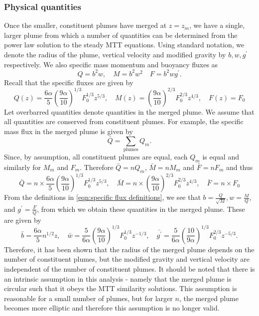 \documentclass{jfm}
\begin{document}
	\subsubsection{Physical quantities}\label{subsubsec:Physical quantities}
	Once the smaller, constituent plumes have merged at $z = z_m$, we have a single, larger plume from which a number of quantities can be determined from the power law solution to the steady MTT equations. Using standard notation, we denote the radius of the plume, vertical velocity and modified gravity by $b, w, g^{\prime}$ respectively. We also specific mass momentum and buoyancy fluxes as
	\begin{equation}
		Q = b^2w, \quad M = b^2 w^2 \quad F = b^2 w g^{\prime}. \label{eqn:specific flux definitions}
	\end{equation}
	Recall that the specific fluxes are given by
	\begin{equation}
		Q(z) = \frac{6\alpha}{5}\left(\frac{9\alpha}{10}\right)^{1/3}F_0^{1/3}z^{5/3}, \quad
		M(z) = \left(\frac{9\alpha}{10}\right)^{2/3}F_0^{2/3}z^{4/3}, \quad F(z) = F_0 \label{eqn:specific flux solutions}
	\end{equation}
	Let overbarred quantities denote quantities in the merged plume. We assume that all quantities are conserved from constituent plumes. For example, the specific mass flux in the merged plume is given by
	\begin{equation}
		\bar{Q} = \sum_{\text{plumes}}Q_m.
	\end{equation}
	Since, by assumption, all constituent plumes are equal, each $Q_m$ is equal and similarly for $M_m$ and $F_m$. Therefore $\bar{Q} = nQ_m$, $\bar{M} = nM_m$ and $\bar{F} = nF_m$ and thus
	\begin{equation}
	\bar{Q} = n \times  \frac{6\alpha}{5}\left(\frac{9\alpha}{10}\right)^{1/3}F_0^{1/3}z^{5/3}, \quad
	\bar{M} = n \times \left(\frac{9\alpha}{10}\right)^{2/3}F_0^{2/3}z^{4/3}, \quad \bar{F} = n\times F_0 \label{eqn:merged quantities}
	\end{equation}
	From the definitions in \eqref{eqn:specific flux definitions}, we see that $b = \tfrac{Q}{\sqrt{M}}, w = \tfrac{M}{Q}$, and $g^{\prime} = \tfrac{F}{Q}$, from which we obtain these quantities in the merged plume. These are given by
	\begin{equation}
		\bar{b} = \frac{6\alpha}{5}n^{1/2}z, \quad \bar{w} = \frac{5}{6\alpha}\left(\frac{9\alpha}{10}\right)^{1/3}F_0^{1/3}z^{-1/3}, \quad \bar{g^{\prime}} = \frac{5}{6\alpha}\left(\frac{10}{9\alpha}\right)^{1/3}F_0^{2/3}z^{-5/3}.
	\end{equation}
	Therefore, it has been shown that the radius of the merged plume depends on the number of constituent plumes, but the modified gravity and vertical velocity are independent of the number of constituent plumes. It should be noted that there is an intrinsic assumption in this analysis - namely that the merged plume is circular such that it obeys the MTT similarity solutions. This assumption is reasonable for a small number of plumes, but for larger $n$, the merged plume becomes more elliptic and therefore this assumption is no longer valid.
\end{document}
